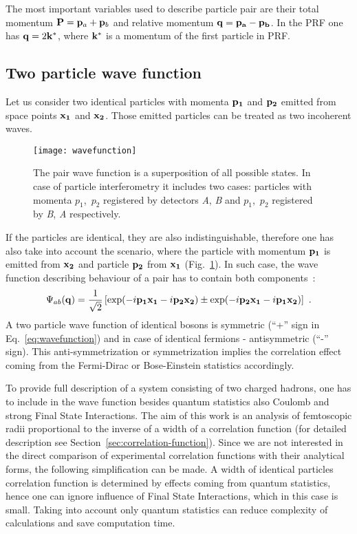       The most important variables used to describe particle pair are their total momentum $\mathbf{P} = \mathbf{p}_a + \mathbf{p}_b$ and relative momentum $\mathbf{q} = \mathbf{p_a} - \mathbf{p_b}$.
      In the PRF one has $\mathbf{q} = 2 \mathbf{k}^{*}$, where $\mathbf{k}^{*}$ is a momentum of the first particle in PRF.

    \subsection{Two particle wave function}
      Let us consider two identical particles with momenta $\mathbf{p_1}$ and $\mathbf{p_2}$ emitted from space points $\mathbf{x_1}$ and $\mathbf{x_2}$.
      Those emitted particles can be treated as two incoherent waves.
      \begin{figure}[h]
        \centering
        \texttt{[image: wavefunction]}
        \caption{The pair wave function is a superposition of all possible states. In case of particle interferometry it includes two cases: particles with momenta $p_1$,~$p_2$ registered by detectors \textit{A}, \textit{B} and $p_1$,~$p_2$ registered by \textit{B}, \textit{A} respectively.}
        \label{fig:wavefunction}
      \end{figure}
      If the particles are identical, they are also indistinguishable, therefore one has also take into account the scenario, where the particle with momentum $\mathbf{p_1}$ is emitted from $\mathbf{x_2}$ and particle $\mathbf{p_2}$ from $\mathbf{x_1}$ (Fig.~\ref{fig:wavefunction}).
      In such case, the wave function describing behaviour of a pair has to contain both components~\cite{drkisiel}:
      \begin{equation}
      \label{eq:wavefunction}
        \Psi_{ab}(\mathbf{q})=\frac{1}{\sqrt{2}} \left[ \exp(- i \mathbf{p_1}\mathbf{x_1} - i \mathbf{p_2}\mathbf{x_2}) \pm \exp(- i \mathbf{p_2}\mathbf{x_1} - i \mathbf{p_1}\mathbf{x_2}) \right]~.
      \end{equation}
      A two particle wave function of identical bosons is symmetric (``+'' sign in Eq.~\ref{eq:wavefunction}) and in case of identical fermions - antisymmetric (``-'' sign).
      This anti-symmetrization or symmetrization implies the correlation effect coming from the Fermi-Dirac or Bose-Einstein statistics accordingly.

      To provide full description of a system consisting of two charged hadrons, one has to include in the wave function besides quantum statistics also Coulomb and strong Final State Interactions.
      The aim of this work is an analysis of femtoscopic radii proportional to the inverse of a width of a correlation function (for detailed description see Section~\ref{sec:correlation-function}).
      Since we are not interested in the direct comparison of experimental correlation functions with their analytical forms, the following simplification can be made.
      A width of identical particles correlation function is determined by effects coming from quantum statistics, hence one can ignore influence of Final State Interactions, which in this case is small. Taking into account only quantum statistics can reduce complexity of calculations and save computation time.
